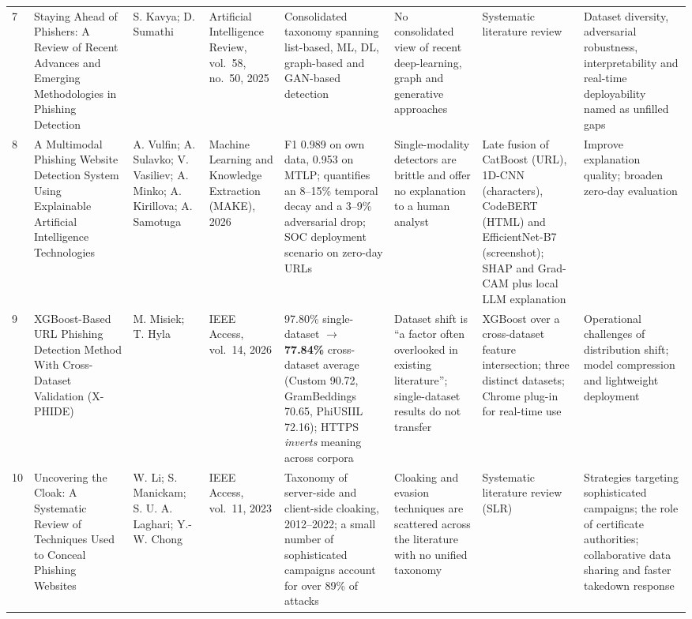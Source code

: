\documentclass[10pt,a4paper]{article}
\begin{document}
{\begin{longtable}{@{}L{4mm} L{34mm} L{26mm} L{22mm} L{40mm} L{34mm} L{40mm} L{34mm}@{}}
7 & Staying Ahead of Phishers: A Review of Recent Advances and Emerging Methodologies in Phishing
Detection &
S. Kavya; D. Sumathi &
Artificial Intelligence Review, vol.~58, no.~50, 2025 &
Consolidated taxonomy spanning list-based, ML, DL, graph-based and GAN-based detection &
No consolidated view of recent deep-learning, graph and generative approaches &
Systematic literature review &
Dataset diversity, adversarial robustness, interpretability and real-time deployability named as
unfilled gaps \\
\addlinespace

8 & A Multimodal Phishing Website Detection System Using Explainable Artificial Intelligence
Technologies &
A. Vulfin; A. Sulavko; V. Vasiliev; A. Minko; A. Kirillova; A. Samotuga &
Machine Learning and Knowledge Extraction (MAKE), 2026 &
F1 0.989 on own data, 0.953 on MTLP; quantifies an 8--15\% temporal decay and a 3--9\%
adversarial drop; SOC deployment scenario on zero-day URLs &
Single-modality detectors are brittle and offer no explanation to a human analyst &
Late fusion of CatBoost (URL), 1D-CNN (characters), CodeBERT (HTML) and EfficientNet-B7
(screenshot); SHAP and Grad-CAM plus local LLM explanation &
Improve explanation quality; broaden zero-day evaluation \\
\addlinespace

9 & XGBoost-Based URL Phishing Detection Method With Cross-Dataset Validation (X-PHIDE) &
M. Misiek; T. Hyla &
IEEE Access, vol.~14, 2026 &
97.80\% single-dataset $\rightarrow$ \textbf{77.84\%} cross-dataset average (Custom 90.72,
GramBeddings 70.65, PhiUSIIL 72.16); HTTPS \emph{inverts} meaning across corpora &
Dataset shift is ``a factor often overlooked in existing literature''; single-dataset results do
not transfer &
XGBoost over a cross-dataset feature intersection; three distinct datasets; Chrome plug-in for
real-time use &
Operational challenges of distribution shift; model compression and lightweight deployment \\
\addlinespace

10 & Uncovering the Cloak: A Systematic Review of Techniques Used to Conceal Phishing Websites &
W. Li; S. Manickam; S. U. A. Laghari; Y.-W. Chong &
IEEE Access, vol.~11, 2023 &
Taxonomy of server-side and client-side cloaking, 2012--2022; a small number of sophisticated
campaigns account for over 89\% of attacks &
Cloaking and evasion techniques are scattered across the literature with no unified taxonomy &
Systematic literature review (SLR) &
Strategies targeting sophisticated campaigns; the role of certificate authorities; collaborative
data sharing and faster takedown response \\

\end{longtable}
}
\end{document}
